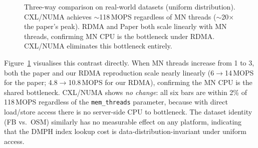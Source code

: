 \documentclass[conference]{IEEEtran}
\begin{document}
\begin{figure}[H]
\centering
{}
\caption{Three-way comparison on real-world datasets (uniform distribution). CXL/NUMA achieves $\sim$118\,MOPS regardless of MN threads ($\sim$20$\times$ the paper's peak). RDMA and Paper both scale linearly with MN threads, confirming MN CPU is the bottleneck under RDMA. CXL/NUMA eliminates this bottleneck entirely.}
\label{fig:dataset-3way-cmp}
\end{figure}

Figure~\ref{fig:dataset-3way-cmp} visualises this contrast directly. When MN threads increase from 1 to 3, both the paper and our RDMA reproduction scale nearly linearly (6$\to$14\,MOPS for the paper; 4.8$\to$10.8\,MOPS for our RDMA), confirming the MN CPU is the shared bottleneck. CXL/NUMA shows \emph{no change}: all six bars are within 2\% of 118\,MOPS regardless of the \texttt{mem\_threads} parameter, because with direct load/store access there is no server-side CPU to bottleneck. The dataset identity (FB vs.\ OSM) similarly has no measurable effect on any platform, indicating that the DMPH index lookup cost is data-distribution-invariant under uniform access.
\end{document}
